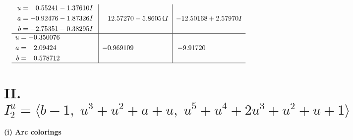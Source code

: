 \documentclass[1p]{elsarticle_modified}
\theoremstyle{definition}
\begin{document}
$$\begin{array}{c|c|c}
\begin{aligned}
u &= \phantom{-}0.55241 - 1.37610 I \\
a &= -0.92476 - 1.87326 I \\
b &= -2.75351 - 0.38295 I\end{aligned}
 & \phantom{-}12.57270 - 5.86054 I & -12.50168 + 2.57970 I \\ \hline\begin{aligned}
u &= -0.350076\phantom{ +0.000000I} \\
a &= \phantom{-}2.09424\phantom{ +0.000000I} \\
b &= \phantom{-}0.578712\phantom{ +0.000000I}\end{aligned}
 & -0.969109\phantom{ +0.000000I} & -9.91720\phantom{ +0.000000I}\\
 \hline 
 \end{array}$$\newpage\newpage\renewcommand{\arraystretch}{1}
\centering \section*{II. $I^u_{2}= \langle b-1,\;u^3+u^2+a+u,\;u^5+u^4+2 u^3+u^2+u+1 \rangle$}
\flushleft \textbf{(i) Arc colorings}\\
\end{document}
